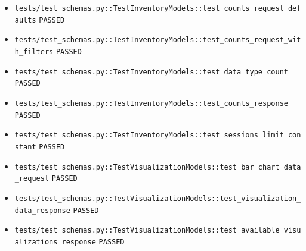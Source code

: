 \documentclass[12pt, titlepage]{article}
\begin{document}
{\begin{itemize}[leftmargin=1.5em, itemsep=0.2em, topsep=0.3em]
  \item \nolinkurl{tests/test_schemas.py::TestInventoryModels::test_counts_request_defaults} \texttt{PASSED}
  \item \nolinkurl{tests/test_schemas.py::TestInventoryModels::test_counts_request_with_filters} \texttt{PASSED}
  \item \nolinkurl{tests/test_schemas.py::TestInventoryModels::test_data_type_count} \texttt{PASSED}
  \item \nolinkurl{tests/test_schemas.py::TestInventoryModels::test_counts_response} \texttt{PASSED}
  \item \nolinkurl{tests/test_schemas.py::TestInventoryModels::test_sessions_limit_constant} \texttt{PASSED}
  \item \nolinkurl{tests/test_schemas.py::TestVisualizationModels::test_bar_chart_data_request} \texttt{PASSED}
  \item \nolinkurl{tests/test_schemas.py::TestVisualizationModels::test_visualization_data_response} \texttt{PASSED}
  \item \nolinkurl{tests/test_schemas.py::TestVisualizationModels::test_available_visualizations_response} \texttt{PASSED}
\end{itemize}
}
\end{document}
